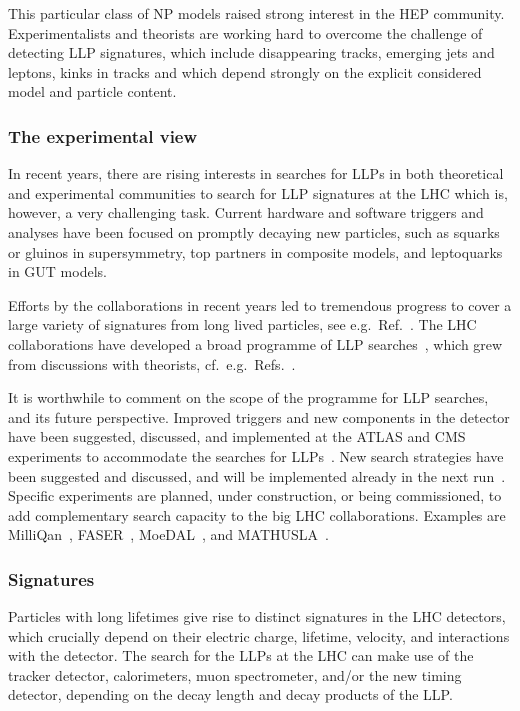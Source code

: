 \documentclass[10pt]{article}
\begin{document}
This particular class of NP models raised strong interest in the HEP community. 
Experimentalists and theorists are working hard to overcome the challenge of detecting LLP signatures, which include disappearing tracks, emerging jets and leptons, kinks in tracks and which depend strongly on the explicit considered model and particle content.


\subsubsection{The experimental view}
%
In recent years, there are rising interests in searches for LLPs in both theoretical and experimental communities to search for LLP signatures at the LHC which is, however, a very challenging task.
Current hardware and software triggers and analyses have been focused on 
promptly decaying new particles, such as squarks or gluinos in supersymmetry, top partners in composite models, and leptoquarks in GUT models.   

Efforts by the collaborations in recent years led to tremendous progress to cover a large variety of signatures from long lived particles, see e.g.\ Ref.~\cite{ATLAS:2019kpx}.
The LHC collaborations have developed a broad programme of LLP searches~\cite{Alimena:2019zri}, which grew from discussions with theorists, cf.\ e.g.\ Refs.~\cite{Liu:2015bma,Lee:2018pag,Alimena:2019zri}.

It is worthwhile to comment on the scope of the programme for LLP searches, and its future perspective.
Improved triggers and new components in the detector have been suggested, discussed, and implemented at the ATLAS and CMS experiments to accommodate the searches for LLPs~\cite{Gershtein:2017tsv,Liu:2018wte,CMS-PAS-FTR-18-018,Liu:2020vur,Gershtein:2020mwi}. 
New search strategies have been suggested and discussed, and will be implemented already in the next run~\cite{Liu:2015bma,Liu:2018wte,Liu:2020vur,Lee:2018pag,Curtin:2018mvb,Alimena:2019zri}. 
Specific experiments are planned, under construction, or being commissioned, to add complementary search capacity to the big LHC collaborations. Examples are MilliQan~\cite{Haas:2014dda}, FASER~\cite{Feng:2017uoz}, MoeDAL~\cite{MoEDAL:2009jwa}, and MATHUSLA~\cite{Curtin:2018mvb}.



\subsubsection{Signatures}
%
Particles with long lifetimes give rise to distinct signatures in the LHC detectors, which crucially depend on their electric charge, lifetime, velocity, and interactions with the detector. 
The search for the LLPs at the LHC can make use of the tracker detector, calorimeters, muon spectrometer, and/or the new timing detector, depending on the decay length and decay products of the LLP. 
\end{document}
